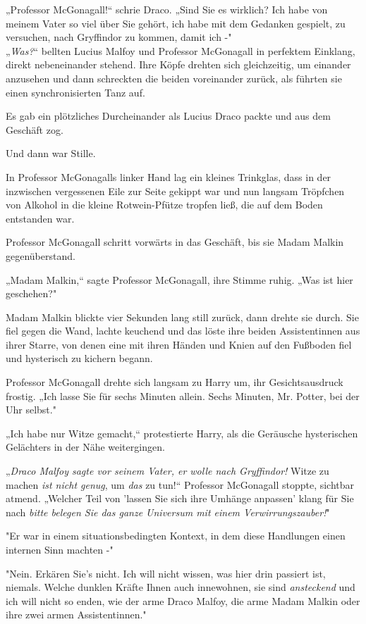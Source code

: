 {„Professor McGonagall!“ schrie Draco. „Sind Sie es wirklich? Ich habe von meinem Vater so viel über Sie gehört, ich habe mit dem Gedanken gespielt, zu versuchen, nach Gryffindor zu kommen, damit ich -"\\ „\emph{Was?}“ bellten Lucius Malfoy und Professor McGonagall in perfektem Einklang, direkt nebeneinander stehend. Ihre Köpfe drehten sich gleichzeitig, um einander anzusehen und dann schreckten die beiden voreinander zurück, als führten sie einen synchronisierten Tanz auf.

Es gab ein plötzliches Durcheinander als Lucius Draco packte und aus dem Geschäft zog.

Und dann war Stille.

In Professor McGonagalls linker Hand lag ein kleines Trinkglas, dass in der inzwischen vergessenen Eile zur Seite gekippt war und nun langsam Tröpfchen von Alkohol in die kleine Rotwein-Pfütze tropfen ließ, die auf dem Boden entstanden war.

Professor McGonagall schritt vorwärts in das Geschäft, bis sie Madam Malkin gegenüberstand.

„Madam Malkin,“ sagte Professor McGonagall, ihre Stimme ruhig. „Was ist hier geschehen?"

Madam Malkin blickte vier Sekunden lang still zurück, dann drehte sie durch. Sie fiel gegen die Wand, lachte keuchend und das löste ihre beiden Assistentinnen aus ihrer Starre, von denen eine mit ihren Händen und Knien auf den Fußboden fiel und hysterisch zu kichern begann.

Professor McGonagall drehte sich langsam zu Harry um, ihr Gesichtsausdruck frostig. „Ich lasse Sie für sechs Minuten allein. Sechs Minuten, Mr. Potter, bei der Uhr selbst."

„Ich habe nur Witze gemacht,“ protestierte Harry, als die Geräusche hysterischen Gelächters in der Nähe weitergingen.

„\emph{Draco Malfoy sagte vor seinem Vater, er wolle nach Gryffindor!} Witze zu machen \emph{ist nicht genug}, um \emph{das} zu tun!“ Professor McGonagall stoppte, sichtbar atmend. „Welcher Teil von 'lassen Sie sich ihre Umhänge anpassen' klang für Sie nach \emph{bitte belegen Sie das ganze Universum mit einem Verwirrungszauber!}"

"Er war in einem situationsbedingten Kontext, in dem diese Handlungen einen internen Sinn machten -"

"Nein. Erkären Sie's nicht. Ich will nicht wissen, was hier drin passiert ist, niemals. Welche dunklen Kräfte Ihnen auch innewohnen, sie sind \emph{ansteckend} und ich will nicht so enden, wie der arme Draco Malfoy, die arme Madam Malkin oder ihre zwei armen Assistentinnen."

}
